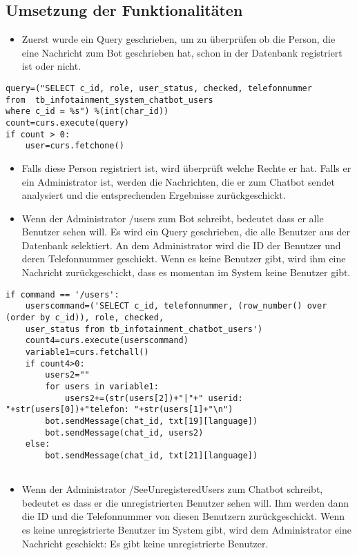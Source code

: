 \subsection{Umsetzung der Funktionalitäten}
\begin{itemize}
	\item Zuerst wurde ein Query geschrieben, um zu überprüfen ob die Person, die eine Nachricht zum Bot geschrieben hat, schon in der Datenbank registriert ist oder nicht. 
\end{itemize} 
\begin{lstlisting}[frame=single]
query=("SELECT c_id, role, user_status, checked, telefonnummer 
from  tb_infotainment_system_chatbot_users 
where c_id = %s") %(int(char_id))
count=curs.execute(query)
if count > 0:
	user=curs.fetchone()
\end{lstlisting}
\begin{itemize}
	\item Falls diese Person registriert ist, wird überprüft welche Rechte er hat. Falls er ein Administrator ist, werden die Nachrichten, die er zum Chatbot sendet analysiert und die entsprechenden Ergebnisse zurückgeschickt. 
\end{itemize}	
\begin{itemize}
	\item Wenn der Administrator /users zum Bot schreibt, bedeutet dass er alle Benutzer sehen will. Es wird ein Query geschrieben, die alle Benutzer aus der Datenbank selektiert. An dem Administrator wird die ID der Benutzer und deren Telefonnummer geschickt. Wenn es keine Benutzer gibt, wird ihm eine Nachricht zur\"uckgeschickt, dass es momentan im System keine Benutzer gibt.
\end{itemize}
\begin{lstlisting}[frame=single]
if command == '/users':
	userscommand=('SELECT c_id, telefonnummer, (row_number() over (order by c_id)), role, checked,
	user_status from tb_infotainment_chatbot_users')
	count4=curs.execute(userscommand)
	variable1=curs.fetchall()
	if count4>0:
		users2=""
		for users in variable1:
			users2+=(str(users[2])+"|"+" userid: "+str(users[0])+"telefon: "+str(users[1]+"\n")
		bot.sendMessage(chat_id, txt[19][language])
		bot.sendMessage(chat_id, users2)
	else:
		bot.sendMessage(chat_id, txt[21][language])
	
\end{lstlisting}
\begin{itemize}
	\item Wenn der Administrator /SeeUnregisteredUsers zum Chatbot schreibt, bedeutet es dass er die unregistrierten Benutzer sehen will. Ihm werden dann die ID und die Telefonnummer von diesen Benutzern zurückgeschickt. Wenn es keine unregistrierte Benutzer im System gibt, wird dem Administrator eine Nachricht geschickt: Es gibt keine unregistrierte Benutzer. 
\end{itemize}
